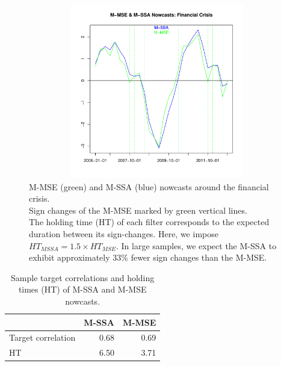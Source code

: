 \documentclass[11pt,a4paper]{article}
\begin{document}
\begin{figure}[H]
    \begin{center}
        \includegraphics[height=3in, width=4.5in]{./Figures/mssa_msse_zc.pdf}
        \caption{M-MSE (green) and M-SSA (blue) nowcasts around the financial crisis.\\
        Sign changes of the M-MSE marked by green vertical lines.\\
        The holding time (HT) of each filter corresponds to the expected duration between its sign-changes. 
        Here, we impose  $HT_{MSSA}=1.5\times HT_{MSE}$. In large samples, we expect the M-SSA to exhibit approximately $33\%$ fewer sign changes than the M-MSE.
        \label{mssa_msse_zc}}
    \end{center}
\end{figure}
\begin{table}[ht]
\centering
\begin{tabular}{lrr}
  \hline
 & M-SSA & M-MSE \\ 
  \hline
Target correlation & 0.68 & 0.69 \\ 
  HT & 6.50 & 3.71 \\ 
   \hline
\end{tabular}
\caption{Sample target correlations and holding times (HT) of M-SSA and M-MSE nowcasts.} 
\label{corhtnow}
\end{table}
\end{document}
